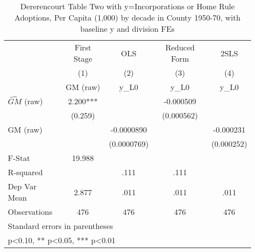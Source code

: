 \begin{table}[htbp]\centering
\def\sym#1{\ifmmode^{#1}\else\(^{#1}\)\fi}
\caption{Dererencourt Table Two with y=Incorporations or Home Rule Adoptions, Per Capita (1,000) by decade in County 1950-70, with baseline y and division FEs}
\begin{tabular}{l*{4}{c}}
\toprule
                    & First Stage   &         OLS   &Reduced Form   &        2SLS   \\
                    &\multicolumn{1}{c}{(1)}&\multicolumn{1}{c}{(2)}&\multicolumn{1}{c}{(3)}&\multicolumn{1}{c}{(4)}\\
                    &\multicolumn{1}{c}{GM  (raw)}&\multicolumn{1}{c}{y\_L0}&\multicolumn{1}{c}{y\_L0}&\multicolumn{1}{c}{y\_L0}\\
\midrule
$\hat{GM}$ (raw)    &       2.200***&               &   -0.000509   &               \\
                    &     (0.259)   &               &  (0.000562)   &               \\
\addlinespace
GM  (raw)           &               &  -0.0000890   &               &   -0.000231   \\
                    &               & (0.0000769)   &               &  (0.000252)   \\
\midrule
F-Stat              &      19.988   &               &               &               \\
R-squared           &               &        .111   &        .111   &               \\
Dep Var Mean        &       2.877   &        .011   &        .011   &        .011   \\
Observations        &         476   &         476   &         476   &         476   \\
\bottomrule
\multicolumn{5}{l}{\footnotesize Standard errors in parentheses}\\
\multicolumn{5}{l}{\footnotesize * p<0.10, ** p<0.05, *** p<0.01}\\
\end{tabular}
\end{table}
